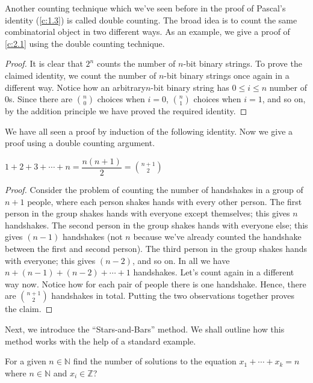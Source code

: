 Another counting technique which we've seen before in the proof of Pascal's identity (\cref{c:1.3}) is called double counting. The broad idea is to count the same combinatorial object in two different ways. As an example, we give a proof of \cref{c:2.1} using the double counting technique.
\begin{proof}
It is clear that $2^n$ counts the number of $n$-bit binary strings. To prove the claimed identity, we count the number of $n$-bit binary strings once again in a different way. Notice how an arbitrary$n$-bit binary string has $0\leq i\leq n$ number of $0$s. Since there are $\binom{n}{0}$ choices when $i=0$, $\binom{n}{1}$ choices when $i=1$, and so on, by the addition principle we have proved the required identity.
\end{proof}
We have all seen a proof by induction of the following identity. Now we give a proof using a double counting argument.
\begin{claim}
	$1+2+3+\cdots+n=\dfrac{n\left( n+1 \right)}{2}=\binom{n+1}{2}$
	\label{c:2.2}
\end{claim}
\begin{proof}
Consider the problem of counting the number of handshakes in a group of $n+1$ people, where each person shakes hands with every other person. The first person in the group shakes hands with everyone except themselves; this gives $n$ handshakes. The second person in the group shakes hands with everyone else; this gives $\left( n-1 \right)$ handshakes (not $n$ because we've already counted the handshake between the first and second person). The third person in the group shakes hands with everyone; this gives $\left( n-2 \right)$, and so on. In all we have $n+\left( n-1 \right)+\left( n-2 \right)+\cdots+1$ handshakes. Let's count again in a different way now. Notice how for each pair of people there is one handshake. Hence, there are $\binom{n+1}{2}$ handshakes in total. Putting the two observations together proves the claim.
\end{proof}
Next, we introduce the ``Stars-and-Bars'' method. We shall outline how this method works with the help of a standard example.
\begin{question}
For a given $n\in \mathbb{N}$ find the number of solutions to the equation  $x_{1}+\cdots+x_{k}=n$ where $n\in\mathbb{N}$ and  $x_{i}\in\mathbb{Z}$?
\label{q:2.3}
\end{question}
